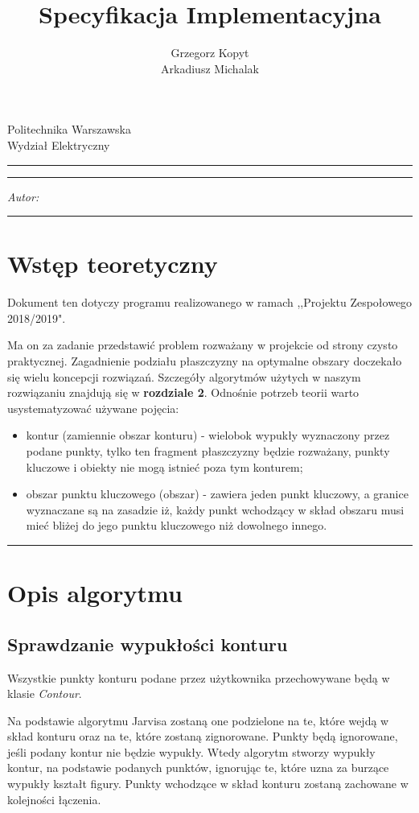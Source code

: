 \documentclass[a4paper,11pt]{article}
\author{Grzegorz Kopyt\\Arkadiusz Michalak}
\title{Specyfikacja Implementacyjna}
\makeatletter
\newcommand{\linia}{\rule{\linewidth}{0.4mm}}
\renewcommand{\maketitle}{\begin{titlepage}
    \vspace*{2cm}
    \begin{center}\LARGE
    Politechnika Warszawska\\
    Wydział Elektryczny\\
    \end{center}
    \vspace{5cm}
    \noindent\linia
    \begin{center}
      \LARGE \textsc{\@title}
         \end{center}
     \linia
    \vspace{0.5cm}
    \begin{flushright}
    \begin{minipage}{5cm}
    \textit{Autor:}\\
    \normalsize \textsc{\@author} \par
    \end{minipage}
    \vspace{5cm}
     \end{flushright}
    \vspace*{\stretch{6}}
    \begin{center}
    \@date
    \end{center}
  \end{titlepage}
}
\makeatother
\begin{document}
\maketitle

\tableofcontents
\vspace{1cm}
\noindent\linia

\section{Wstęp teoretyczny}
Dokument ten dotyczy programu realizowanego w ramach ,,Projektu Zespołowego 2018/2019".

Ma on za zadanie przedstawić problem rozważany w projekcie od strony czysto praktycznej. Zagadnienie podziału płaszczyzny na optymalne obszary doczekało się wielu koncepcji rozwiązań. Szczegóły algorytmów użytych w naszym rozwiązaniu znajdują się w \textbf{rozdziale 2}. Odnośnie potrzeb teorii warto usystematyzować używane pojęcia:
\begin{itemize}
\item kontur (zamiennie obszar konturu) - wielobok wypukły wyznaczony przez podane punkty, tylko ten fragment płaszczyzny będzie rozważany, punkty kluczowe i obiekty nie mogą istnieć poza tym konturem;
\item obszar punktu kluczowego (obszar) - zawiera jeden punkt kluczowy, a granice wyznaczane są na zasadzie iż, każdy punkt wchodzący w skład obszaru musi mieć bliżej do jego punktu kluczowego niż dowolnego innego.
\end{itemize} 

\noindent\linia
\section{Opis algorytmu}
\subsection{Sprawdzanie wypukłości konturu}
Wszystkie punkty konturu podane przez użytkownika przechowywane będą w klasie \textit{Contour}.

Na podstawie algorytmu Jarvisa zostaną one podzielone na te, które wejdą w skład konturu oraz na te, które zostaną zignorowane. Punkty będą ignorowane, jeśli podany kontur nie będzie wypukły. Wtedy algorytm stworzy wypukły kontur, na podstawie podanych punktów, ignorując te, które uzna za burzące wypukły kształt figury. Punkty wchodzące w skład konturu zostaną zachowane w kolejności łączenia.
\end{document}
